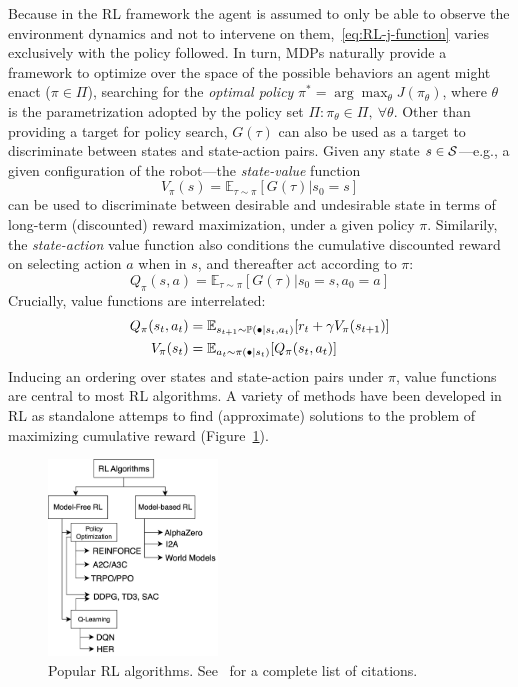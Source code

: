 Because in the RL framework the agent is assumed to only be able to observe the environment dynamics and not to intervene on them,~\ref{eq:RL-j-function} varies exclusively with the policy followed.
In turn, MDPs naturally provide a framework to optimize over the space of the possible behaviors an agent might enact (\( \pi \in \Pi \)), searching for the \emph{optimal policy} \( \pi^* = \arg \max_{\theta} J(\pi_\theta) \), where \( \theta \) is the parametrization adopted by the policy set \( \Pi: \pi_\theta \in \Pi, \ \forall \theta \).
Other than providing a target for policy search, \( G(\tau) \) can also be used as a target to discriminate between states and state-action pairs.
Given any state \( s \in \mathcal S \)---e.g., a given configuration of the robot---the \emph{state-value} function
\[
    V_\pi(s) = \mathbb E_{\tau \sim \pi} \left[ G(\tau) \big \vert s_0 = s \right]
\]
can be used to discriminate between desirable and undesirable state in terms of long-term (discounted) reward maximization, under a given policy \(\pi\).
Similarily, the \emph{state-action} value function also conditions the cumulative discounted reward on selecting action \( a \) when in \( s \), and thereafter act according to \( \pi \):
\[
    Q_\pi(s,a) = \mathbb E_{\tau \sim \pi} \left[ G (\tau) \big \vert s_0 = s, a_0=a \right]
\]
Crucially, value functions are interrelated:
\begin{align}
Q_\pi(s_t, a_t) &= \mathbb{E}_{\stateplusone \sim \mathbb P(\bullet \vert \state, \action)} \left[ r_t + \gamma V_\pi(\stateplusone) \right] \label{eq:q-as-v} \\
V_\pi(\state) &= \mathbb E_{\action \sim \pi(\bullet \vert \state)} \left[ Q_\pi (\state, \action) \right]
\label{eq:v-as-q}
\end{align}
Inducing an ordering over states and state-action pairs under \( \pi \), value functions are central to most RL algorithms.
A variety of methods have been developed in RL as standalone attemps to find (approximate) solutions to the problem of maximizing cumulative reward (Figure~\ref{fig:rl-algos-atlas}).

\begin{figure}
    \centering
    \includegraphics[width=0.4\textwidth]{figures/ch3/ch3-rl-algorithms-atlas.png}
    \caption{Popular RL algorithms. See~\citet{SpinningUp2018} for a complete list of citations.}
    \label{fig:rl-algos-atlas}
\end{figure}

